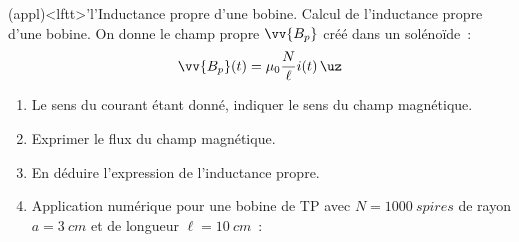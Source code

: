 \documentclass[../../main/main.tex]{subfiles}
\begin{document}
\begin{tcb*}[breakable](appl)<lftt>'l'{Inductance propre d'une bobine.}
	Calcul de l'inductance propre d'une bobine. On donne le champ propre
	$\vv{B_p}$ créé dans un solénoïde~:
	\[
		\vv{B_p}(t) = \mu_0 \frac{N}{\ell }i(t)\,\uz
	\]
	\begin{enumerate}
		\item Le sens du courant étant donné, indiquer le sens du champ magnétique.
		      \smallbreak
		      \noindent
		      \begin{minipage}[c]{.4\linewidth}
			      \begin{center}
			      \end{center}
		      \end{minipage}
		      \hfill
		      \begin{minipage}[c]{.69\linewidth}
		      \end{minipage}
		\item Exprimer le flux du champ magnétique.
		      \smallbreak
		\item En déduire l'expression de l'inductance propre.

		\item Application numérique pour une bobine de TP avec $N =
			      \SI{1000}{spires}$ de rayon $a = \SI{3}{cm}$ et de longueur $\ell =
			      \SI{10}{cm}$~:
		      \psw{%
			      \[
				      L \approx \SI{35}{mH}
			      \]
			      \vspace*{-10pt}
		      }%
	\end{enumerate}
\end{tcb*}
\end{document}
